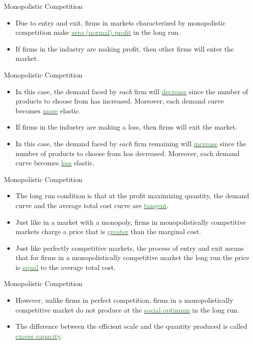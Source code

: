 \documentclass[xcolor={dvipsnames},pdf, hyperref={colorlinks=true, citecolor=ForestGreen, linkcolor=BlueViolet, urlcolor=Magenta}, handout]{beamer}
\theoremstyle{definition}
\newcommand{\dd}[1]{{\underline{\textcolor{ForestGreen}{#1}}}}
\begin{document}
\begin{frame}{Monopolistic Competition}
	\begin{itemize}
		\item 	Due to entry and exit, firms in markets characterized by monopolistic competition make \dd{zero (normal) profit} in the long run. 
		\item If firms in the industry are making profit, then other firms will enter the market. 
	
	\end{itemize}
\end{frame}

\begin{frame}{Monopolistic Competition}
	\begin{itemize}
	
		\item In this case, the demand faced by \textit{each} firm will \dd{decrease} since the number of products to choose from has increased. Moreover, each demand curve becomes \dd{more} elastic.
		\item If firms in the industry are making a loss, then firms will exit the market. 
		\item In this case, the demand faced by \textit{each} firm remaining will \dd{increase} since the number of products to choose from has decreased. Moreover, each demand curve becomes \dd{less} elastic.
	\end{itemize}
\end{frame}

\begin{frame}{Monopolistic Competition}
	\begin{itemize}
		\item 	The long run condition is that at the profit maximizing quantity, the demand curve and the average total cost curve are \dd{tangent}.
		\item Just like in a market with a monopoly, firms in monopolistically competitive markets charge a price that is \dd{greater} than the marginal cost. 
		\item Just like perfectly competitive markets, the process of entry and exit means that for firms in a monopolistically competitive market the long run the price is \dd{equal} to the average total cost. 
	\end{itemize}
\end{frame}

\begin{frame}{Monopolistic Competition}
	\begin{itemize}
		\item However, unlike firms in perfect competition, firms in a monopolistically competitive market do not produce at the \dd{social optimum} in the long run.
		\item The difference between the efficient scale and the quantity produced is called \dd{excess capacity}.
	\end{itemize}
\end{frame}
\end{document}
